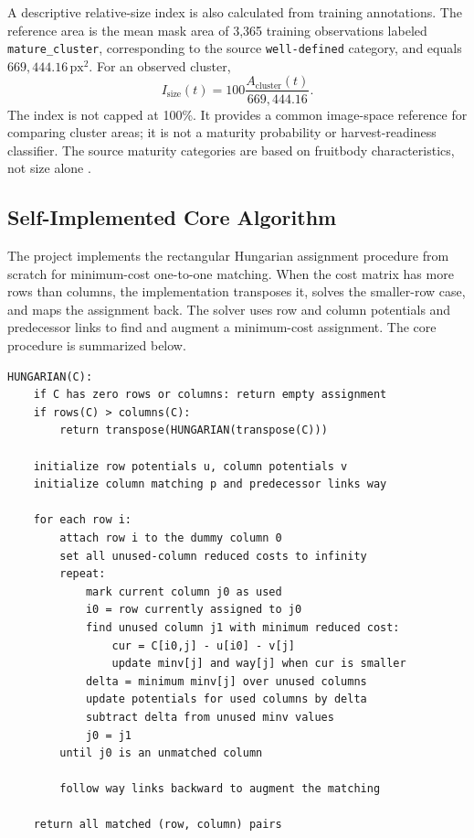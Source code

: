 \documentclass[11pt,a4paper]{article}
\begin{document}
A descriptive relative-size index is also calculated from training annotations. The reference area is the mean mask area of 3,365 training observations labeled \texttt{mature\_cluster}, corresponding to the source \texttt{well-defined} category, and equals $669{,}444.16\,\mathrm{px}^2$. For an observed cluster,
\begin{equation}
I_{\mathrm{size}}(t)=100\frac{A_{\mathrm{cluster}}(t)}{669{,}444.16}.
\end{equation}
The index is not capped at 100\%. It provides a common image-space reference for comparing cluster areas; it is not a maturity probability or harvest-readiness classifier. The source maturity categories are based on fruitbody characteristics, not size alone \cite{charisis}.

\subsection{Self-Implemented Core Algorithm}

The project implements the rectangular Hungarian assignment procedure from scratch for minimum-cost one-to-one matching. When the cost matrix has more rows than columns, the implementation transposes it, solves the smaller-row case, and maps the assignment back. The solver uses row and column potentials and predecessor links to find and augment a minimum-cost assignment. The core procedure is summarized below.

\begin{lstlisting}[caption={Rectangular Hungarian assignment used for track-to-detection association.},label={lst:hungarian}]
HUNGARIAN(C):
    if C has zero rows or columns: return empty assignment
    if rows(C) > columns(C):
        return transpose(HUNGARIAN(transpose(C)))

    initialize row potentials u, column potentials v
    initialize column matching p and predecessor links way

    for each row i:
        attach row i to the dummy column 0
        set all unused-column reduced costs to infinity
        repeat:
            mark current column j0 as used
            i0 = row currently assigned to j0
            find unused column j1 with minimum reduced cost:
                cur = C[i0,j] - u[i0] - v[j]
                update minv[j] and way[j] when cur is smaller
            delta = minimum minv[j] over unused columns
            update potentials for used columns by delta
            subtract delta from unused minv values
            j0 = j1
        until j0 is an unmatched column

        follow way links backward to augment the matching

    return all matched (row, column) pairs
\end{lstlisting}
\end{document}
